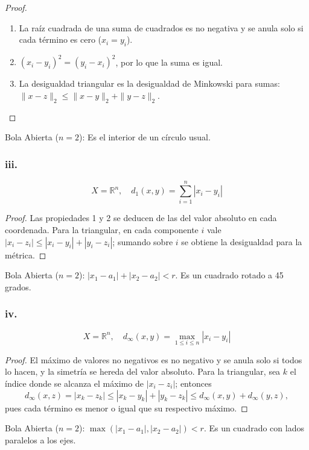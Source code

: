 \documentclass[11pt, a4paper]{article}
\begin{document}
\begin{proof}
\begin{enumerate}
    \item La raíz cuadrada de una suma de cuadrados es no negativa y se anula solo si cada término es
    cero ($x_i = y_i$).
    \item $(x_i - y_i)^2 = (y_i - x_i)^2$, por lo que la suma es igual.
    \item La desigualdad triangular es la desigualdad de Minkowski para sumas:
    $\|x - z\|_2 \le \|x - y\|_2 + \|y - z\|_2$.
\end{enumerate}
\end{proof}

Bola Abierta ($n=2$): Es el interior de un círculo usual.

\subsubsection*{iii.}
$$ X = \mathbb{R}^n, \quad d_1(x, y) = \sum_{i=1}^n |x_i - y_i| $$

\begin{proof}
Las propiedades 1 y 2 se deducen de las del valor absoluto en cada coordenada. Para la triangular,
en cada componente $i$ vale $|x_i - z_i| \le |x_i - y_i| + |y_i - z_i|$; sumando sobre $i$ se obtiene
la desigualdad para la métrica.
\end{proof}

Bola Abierta ($n=2$): $|x_1 - a_1| + |x_2 - a_2| < r$. Es un cuadrado rotado a 45 grados.

\subsubsection*{iv.}
$$ X = \mathbb{R}^n, \quad d_\infty(x, y) = \max_{1 \le i \le n} |x_i - y_i| $$

\begin{proof}
El máximo de valores no negativos es no negativo y se anula solo si todos lo hacen, y la simetría se
hereda del valor absoluto. Para la triangular, sea $k$ el índice donde se alcanza el máximo de
$|x_i - z_i|$; entonces
$$ d_\infty(x, z) = |x_k - z_k| \le |x_k - y_k| + |y_k - z_k| \le d_\infty(x, y) + d_\infty(y, z), $$
pues cada término es menor o igual que su respectivo máximo.
\end{proof}

Bola Abierta ($n=2$): $\max(|x_1 - a_1|, |x_2 - a_2|) < r$. Es un cuadrado con lados paralelos a los
ejes.
\end{document}
